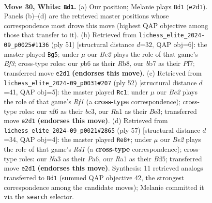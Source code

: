\documentclass[11pt]{article}
\begin{document}
\clearpage

\begin{figure}[p]\centering
\begin{subfigure}{0.46\textwidth}\centering
\resizebox{\linewidth}{!}{%
\newchessgame
\chessboard[
  setfen={r7/pbpp2k1/1p3n1p/5p2/2P2P2/NP1K4/P2PB2P/R7 w - - 5 30},
  showmover=false,
  pgfstyle=straightmove, color=movearrow, markmove={e2-d1}
]}
\caption{}
\end{subfigure}\hfill
\begin{subfigure}{0.46\textwidth}\centering
\resizebox{\linewidth}{!}{%
\newchessgame
\chessboard[
  setfen={1r6/p4pkp/B2p1bp1/2pP4/4P3/5P2/P3K1PP/3R4 b - - 1 26},
  showmover=false,
  pgfstyle=straightmove, color=movearrow, markmove={f6-g5}
]}
\caption{}
\end{subfigure}
\\[4pt]
\begin{subfigure}{0.46\textwidth}\centering
\resizebox{\linewidth}{!}{%
\newchessgame
\chessboard[
  setfen={3r2k1/1p3p1p/2p3p1/p7/P4PP1/1Pb1B2P/5P2/5RK1 w - - 2 27},
  showmover=false,
  pgfstyle=straightmove, color=movearrow, markmove={f1-c1}
]}
\caption{}
\end{subfigure}\hfill
\begin{subfigure}{0.46\textwidth}\centering
\resizebox{\linewidth}{!}{%
\newchessgame
\chessboard[
  setfen={2kr4/1pp4p/p4p2/2pb1Pp1/6P1/3PK2P/1P2N3/3R4 b - - 1 29},
  showmover=false,
  pgfstyle=straightmove, color=movearrow, markmove={d8-e8}
]}
\caption{}
\end{subfigure}
\caption{\textbf{Move 30, White: \texttt{Bd1}.} (a) Our position; Melanie plays \texttt{Bd1} (\texttt{e2d1}). Panels (b)--(d) are the retrieved master positions whose correspondence most drove this move (highest QAP objective among those that transfer to it). (b) Retrieved from \texttt{lichess\_elite\_2024-09\_p0025\#1136} (ply 51) [structural distance $d$=32, QAP obj=6]: the master played \texttt{Bg5}; under $\mu$ our \emph{Be2} plays the role of that game's \emph{Bf3}; cross-type roles: our \emph{p}b6 as their \emph{R}b8, our \emph{b}b7 as their \emph{P}f7; transferred move \texttt{e2d1} \textbf{(endorses this move)}. (c) Retrieved from \texttt{lichess\_elite\_2024-09\_p0031\#207} (ply 52) [structural distance $d$=41, QAP obj=5]: the master played \texttt{Rc1}; under $\mu$ our \emph{Be2} plays the role of that game's \emph{Rf1} (a \textbf{cross-type} correspondence); cross-type roles: our \emph{n}f6 as their \emph{b}c3, our \emph{R}a1 as their \emph{B}e3; transferred move \texttt{e2d1} \textbf{(endorses this move)}. (d) Retrieved from \texttt{lichess\_elite\_2024-09\_p0021\#2865} (ply 57) [structural distance $d$=34, QAP obj=4]: the master played \texttt{Re8+}; under $\mu$ our \emph{Be2} plays the role of that game's \emph{Rd1} (a \textbf{cross-type} correspondence); cross-type roles: our \emph{N}a3 as their \emph{P}a6, our \emph{R}a1 as their \emph{B}d5; transferred move \texttt{e2d1} \textbf{(endorses this move)}. Synthesis: 11 retrieved analogs transferred to \texttt{Bd1} (summed QAP objective 42, the strongest correspondence among the candidate moves); Melanie committed it via the \texttt{search} selector.}
\label{fig:thought-m58}
\end{figure}
\end{document}
